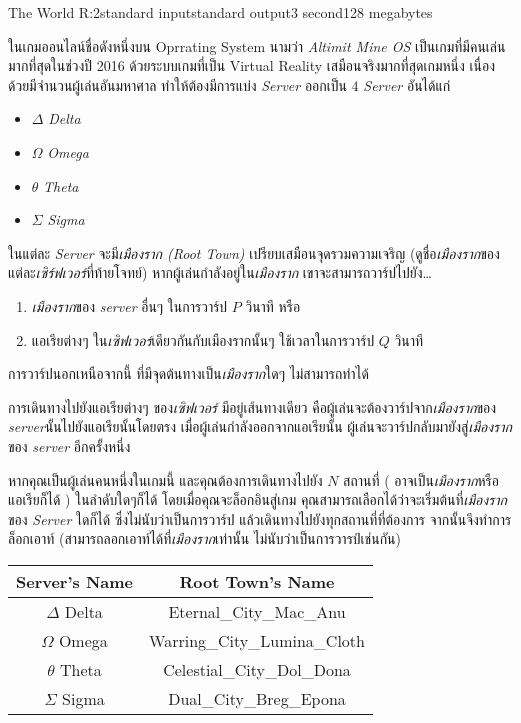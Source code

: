 \documentclass[11pt,a4paper]{article}
\begin{document}
\begin{problem}{The World R:2}{standard input}{standard output}{3 second}{128 megabytes}

 ในเกมออนไลน์ชื่อดังหนึ่งบน Oprrating System นามว่า\textit{ Altimit Mine OS} เป็นเกมที่มีคนเล่นมากที่สุดในช่วงปี 2016 ด้วยระบบเกมที่เป็น Virtual Reality เสมือนจริงมากที่สุดเกมหนึ่ง เนื่องด้วยมีจำนวนผู้เล่นอันมหาศาล ทำให้ต้องมีการแบ่ง \textit{Server} ออกเป็น $4$ \textit{Server} อันได้แก่
\begin{itemize}

\item $\Delta$ \textit{Delta}
\item $\Omega$ \textit{Omega}
\item $\theta$ \textit{Theta}
\item $\Sigma$ \textit{Sigma}
\end{itemize}

 ในแต่ละ \textit{Server} จะมี\textit{เมืองราก  (Root Town)} เปรียบเสมือนจุดรวมความเจริญ (ดูชื่อ\textit{เมืองราก}ของแต่ละ\textit{เซิร์ฟเวอร์}ที่ท้ายโจทย์) หากผู้เล่นกำลังอยู่ใน\textit{เมืองราก} เขาจะสามารถวาร์ปไปยัง…
\begin{enumerate}

\item \textit{เมืองราก}ของ \textit{server} อื่นๆ ในการวาร์ป $P$ วินาที หรือ
\item แอเรียต่างๆ ใน\textit{เซิฟเวอร์}เดียวกันกับเมืองรากนั้นๆ ใช้เวลาในการวาร์ป $Q$ วินาที
\end{enumerate}

การวาร์ปนอกเหนือจากนี้ ที่มีจุดต้นทางเป็น\textit{เมืองราก}ใดๆ ไม่สามารถทำได้

การเดินทางไปยังแอเรียต่างๆ ของ\textit{เซิฟเวอร์} มีอยู่เส้นทางเดียว คือผู้เล่นจะต้องวาร์ปจาก\textit{เมืองราก}ของ \textit{server}นั้นไปยังแอเรียนั้นโดยตรง เมื่อผู้เล่นกำลังออกจากแอเรียนั้น ผู้เล่นจะวาร์ปกลับมายังสู่\textit{เมืองราก}ของ \textit{server} อีกครั้งหนึ่ง

หากคุณเป็นผู้เล่นคนหนึ่งในเกมนี้ และคุณต้องการเดินทางไปยัง $N$ สถานที่ ( อาจเป็น\textit{เมืองราก}หรือแอเรียก็ได้ ) ในลำดับใดๆก็ได้ โดยเมื่อคุณจะล็อกอินสู่เกม คุณสามารถเลือกได้ว่าจะเริ่มต้นที่\textit{เมืองราก}ของ \textit{Server}  ใดก็ได้ ซึ่งไม่นับว่าเป็นการวาร์ป แล้วเดินทางไปยังทุกสถานที่ที่ต้องการ จากนั้นจึงทำการล็อกเอาท์ (สามารถลอกเอาท์ได้ที่\textit{เมืองราก}เท่านั้น ไม่นับว่าเป็นการวารป์เช่นกัน)

\begin{center}
\begin{tabular}{|c|c|}
\hline
Server's Name & Root Town's Name\\
\hline \hline
$\Delta$ Delta & Eternal\_City\_Mac\_Anu\\
\hline
$\Omega$ Omega & Warring\_City\_Lumina\_Cloth\\
\hline
$\theta$ Theta & Celestial\_City\_Dol\_Dona\\
\hline
$\Sigma$ Sigma & Dual\_City\_Breg\_Epona\\
\hline
\end{tabular}
\end{center}


\end{problem}
\end{document}
